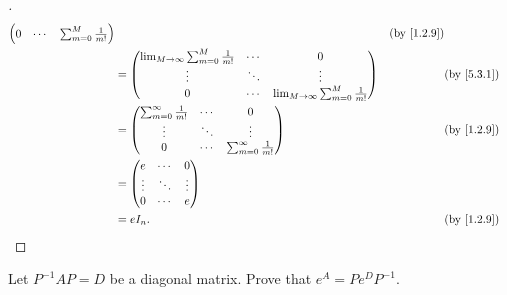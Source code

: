 \begin{proof}[]
\begin{align*}
\begin{pmatrix}
                                      0                            & \cdots & \sum_{m = 0}^M \frac{1}{m!}
                                    \end{pmatrix}                                        &  & \text{(by \cref{1.2.9})}                                     \\
            & = \begin{pmatrix}
                  \lim_{M \to \infty} \sum_{m = 0}^M  \frac{1}{m!} & \cdots & 0                                              \\
                  \vdots                                           & \ddots & \vdots                                         \\
                  0                                                & \cdots & \lim_{M \to \infty}\sum_{m = 0}^M \frac{1}{m!}
                \end{pmatrix} &  & \text{(by \cref{5.3.1})}                                 \\
            & = \begin{pmatrix}
                  \sum_{m = 0}^\infty \frac{1}{m!} & \cdots & 0                                \\
                  \vdots                           & \ddots & \vdots                           \\
                  0                                & \cdots & \sum_{m = 0}^\infty \frac{1}{m!}
                \end{pmatrix}                               &  & \text{(by \cref{1.2.9})}                                                               \\
            & = \begin{pmatrix}
                  e      & \cdots & 0      \\
                  \vdots & \ddots & \vdots \\
                  0      & \cdots & e
                \end{pmatrix}                                                                                                                   \\
            & = e I_n.                                                                                                      &  & \text{(by \cref{1.2.9})}
  \end{align*}
\end{proof}

\begin{ex}\label{ex:5.3.21}
  Let \(P^{-1} A P = D\) be a diagonal matrix.
  Prove that \(e^A = P e^D P^{-1}\).
\end{ex}

